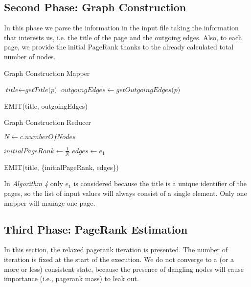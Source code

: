 \subsection{Second Phase: Graph Construction}
In this phase we parse the information in the input file taking the information that interests us, i.e. the title of the page and the outgoing edges. Also, to each page, we provide the initial PageRank thanks to the already calculated total number of nodes. 

\begin{algorithm}[H]
	\caption{Graph Construction Mapper}\label{Mapper}
		\begin{algorithmic}[1]
					\State $\textit{title} \gets \textit{getTitle(p)}$
					\State $ outgoingEdges \gets \textit{getOutgoingEdges(p)}$
		
					\State EMIT(title, outgoingEdges)
			\EndProcedure
			
			
	\end{algorithmic}
\end{algorithm}

\begin{algorithm}[H]
	\caption{Graph Construction Reducer}\label{Reducer}
		\begin{algorithmic}[1]
				\State $N \gets c.numberOfNodes$
			\EndProcedure
		
					\State $\textit{initialPageRank} \gets \frac{1}{N} $
					\State $ \textit{edges} \gets e_1$
		
					\State EMIT(title, \{initialPageRank, edges\})
				
			\EndProcedure
		\end{algorithmic}
\end{algorithm}

\noindent In \textit{Algorithm 4} only $e_1$ is considered because the title is a unique identifier of the pages, so the list of input values will always consist of a single element. Only one mapper will manage one page.

\subsection{Third Phase: PageRank Estimation}
In this section, the relaxed pagerank iteration is presented.
\noindent The number of iteration is fixed at the start of the execution. We do not converge to a (or a more or less) consistent state, because the presence of dangling nodes will cause importance (i.e., pagerank mass) to leak out.

